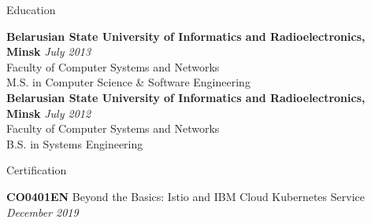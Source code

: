 \documentclass{resume} %
\begin{document}

\begin{rSection}{Education}

{\bf Belarusian State University of Informatics and Radioelectronics, Minsk} \hfill {\em July 2013} \\ 
Faculty of Computer Systems and Networks \\
M.S. in Computer Science \& Software Engineering \smallskip \\
{\bf Belarusian State University of Informatics and Radioelectronics, Minsk} \hfill {\em July 2012} \\ 
Faculty of Computer Systems and Networks \\
B.S. in Systems Engineering \\

\end{rSection}

\begin{rSection}{Certification}

{\bf CO0401EN } Beyond the Basics: Istio and IBM Cloud Kubernetes Service \hfill {\em December 2019} \\

\end{rSection}

\end{document}
